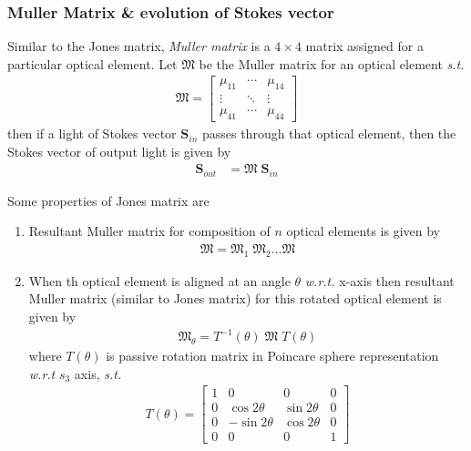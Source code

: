 \documentclass[11pt,a4paper]{article}
\numberwithin{equation}{section}
\begin{document}
\subsubsection{Muller Matrix \& evolution of Stokes vector}
Similar to the Jones matrix, \textit{Muller matrix} is a $4\times4$ matrix assigned for a particular optical element. Let $\boldsymbol{\mathfrak{M}}$ be the Muller matrix for an optical element \textit{s.t.} 
\begin{align*}\boldsymbol{\mathfrak{M}}=
	\begin{bmatrix}
		\mu_{11} & \cdots & \mu_{14}\\
		\vdots & \ddots & \vdots\\
		\mu_{41} & \cdots & \mu_{44}
	\end{bmatrix}
\end{align*}
then if a light of Stokes vector $\boldsymbol{S}_{in}$ passes through that optical element, then the Stokes vector of output light is given by 
\begin{align}
	\boldsymbol{S}_{out}&=\boldsymbol{\mathfrak{M}}\;\boldsymbol{S}_{in}\label{eq:1.33}
\end{align}

Some properties of Jones matrix are 
\begin{enumerate}
	\item Resultant Muller matrix for composition of $n$ optical elements is given by
	\begin{align}
		\boldsymbol{\mathfrak{M}}=\boldsymbol{\mathfrak{M}}_1\;\boldsymbol{\mathfrak{M}}_2 \dots {\boldsymbol{\mathfrak{M}}}
	\end{align}
	\item When th optical element is aligned at an angle $\theta$ \textit{w.r.t.} x-axis then resultant Muller matrix (similar to Jones matrix) for this rotated optical element is given by
	\begin{align}
		\boldsymbol{\mathfrak{M}}_\theta = T^{-1}(\theta)\;\boldsymbol{\mathfrak{M}}\;T(\theta)
	\end{align}
	where $T(\theta)$ is passive rotation matrix in Poincare sphere representation \textit{w.r.t} $s_3$ axis, \textit{s.t.}
	\begin{align}
		T(\theta)=
		\begin{bmatrix}
			1 & 0 & 0 & 0\\
			0 & \cos2\theta & \sin2\theta & 0 \\
			0 & -\sin2\theta & \cos2\theta & 0\\
			0 & 0 & 0 & 1
		\end{bmatrix} \label{poincare rotation matrix}
	\end{align}
\end{enumerate}
\end{document}
